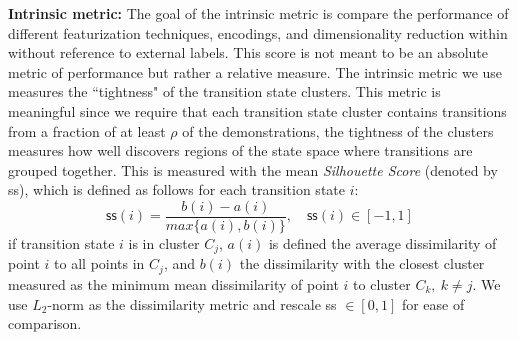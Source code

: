 \documentclass[0-main.tex]{subfiles}
\begin{document}
\vspace{0.25em}
\noindent \textbf{Intrinsic metric:} The goal of the intrinsic metric is compare the performance of different featurization techniques, encodings, and dimensionality reduction within \tsc without reference to external labels.
This score is not meant to be an absolute metric of performance but rather a relative measure.
The intrinsic metric we use measures the ``tightness" of the transition state clusters. 
This metric is meaningful since we require that each transition state cluster contains transitions from a fraction of at least $\rho$ of the demonstrations, the tightness of the clusters measures how well \tsc discovers regions of the state space where transitions are grouped together.
This is measured with the mean \textit{Silhouette Score} (denoted by \textsf{ss}), which is defined as follows for each transition state $i$:  \vspace{-5pt}
\[ \textsf{ss}(i) = \frac{b(i) - a(i)}{max\{a(i), b(i)\}},\quad \textsf{ss}(i) \in [-1,1]
\]
if transition state $i$ is in cluster $C_j$, $a(i)$ is defined the average dissimilarity of point $i$ to all points in $C_j$, and $b(i)$ the dissimilarity with the closest cluster measured as the minimum mean dissimilarity of point $i$ to cluster $C_k,\ k\neq j$. We use $L_2$-norm as the dissimilarity metric and rescale \textsf{ss} $\in[0,1]$ for ease of comparison. 

\end{document}
